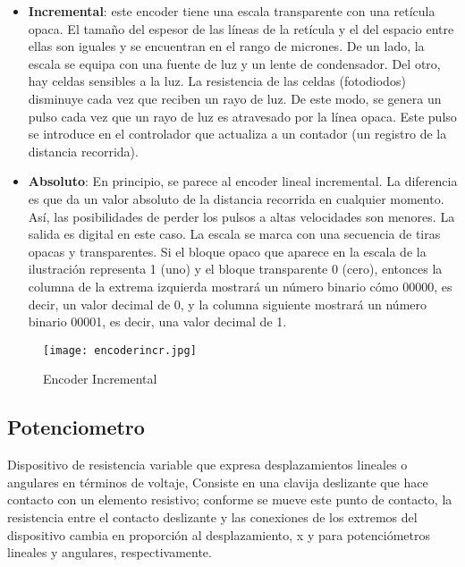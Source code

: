 \begin{itemize}

	\item \textbf{Incremental}: este encoder tiene una escala transparente con una retícula opaca. El tamaño del espesor de las líneas de la retícula y el del espacio entre ellas son iguales y se encuentran en el rango de micrones. De un lado, la escala se equipa con una fuente de luz y un lente de condensador. Del otro, hay celdas sensibles a la luz. La resistencia de las celdas (fotodiodos) disminuye cada vez que reciben un rayo de luz. De este modo, se genera un pulso cada vez que un rayo de luz es atravesado por la línea opaca. Este pulso se introduce en el controlador que actualiza a un contador (un registro de la distancia recorrida).
	
	\item \textbf{Absoluto}: En principio, se parece al encoder lineal incremental. La diferencia es que da un valor absoluto de la distancia recorrida en cualquier momento. Así, las posibilidades de perder los pulsos a altas velocidades son menores. La salida es digital en este caso. La escala se marca con una secuencia de tiras opacas y transparentes. Si el bloque opaco que aparece en la escala de la ilustración representa 1 (uno) y el bloque transparente 0 (cero), entonces la columna de la extrema izquierda mostrará un número binario cómo 00000, es decir, un valor decimal de 0, y la columna siguiente mostrará un número binario 00001, es decir, una valor decimal de 1.
\end{itemize}

\begin{figure}[h] %
	\centering
	\texttt{[image: encoderincr.jpg]} %
	\caption{Encoder Incremental}
	\label{fig:ejemplo}
\end{figure}
\vspace{10cm}
\subsection*{\quad\textbf{Potenciometro}}
Dispositivo de resistencia variable que expresa desplazamientos lineales o angulares en términos de voltaje, Consiste en una clavija deslizante que hace contacto con un elemento resistivo; conforme se mueve este punto de contacto, la resistencia entre el contacto deslizante y las conexiones de los extremos del dispositivo cambia en proporción al desplazamiento, x y  para potenciómetros lineales y angulares, respectivamente.


